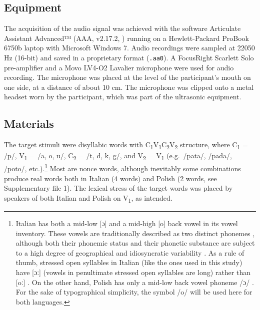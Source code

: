 \documentclass[charis]{glossa}
\begin{document}
\hypertarget{equipment}{%
\subsection{Equipment}\label{equipment}}

The acquisition of the audio signal was achieved with the software
Articulate Assistant Advanced™ (AAA, v2.17.2, \citealt{articulate2011})
running on a Hewlett-Packard ProBook 6750b laptop with Microsoft Windows
7. Audio recordings were sampled at 22050 Hz (16-bit) and saved in a
proprietary format (\texttt{.aa0}). A FocusRight Scarlett Solo
pre-amplifier and a Movo LV4-O2 Lavalier microphone were used for audio
recording. The microphone was placed at the level of the participant's
mouth on one side, at a distance of about 10 cm. The microphone was
clipped onto a metal headset worn by the participant, which was part of
the ultrasonic equipment.

\hypertarget{materials}{%
\subsection{Materials}\label{materials}}

\label{s:materials}

The target stimuli were disyllabic words with
C\textsubscript{1}V\textsubscript{1}C\textsubscript{2}V\textsubscript{2}
structure, where C\textsubscript{1} = /p/, V\textsubscript{1} = /a, o,
u/, C\textsubscript{2} = /t, d, k, g/, and V\textsubscript{2} =
V\textsubscript{1} (e.g.~/pata/, /pada/, /poto/,
etc.).\footnote{Italian has both a mid-low [ɔ] and a mid-high [o] back vowel in its vowel inventory. These vowels are traditionally described as two distinct phonemes \citep{kramer2009}, although both their phonemic status and their phonetic substance are subject to a high degree of geographical and idiosyncratic variability \citep{renwick2016}. As a rule of thumb, stressed open syllables in Italian (like the ones used in this study) have [ɔː] (vowels in penultimate stressed open syllables are long) rather than [oː] \citep{renwick2016}. On the other hand, Polish has only a mid-low back vowel phoneme /ɔ/ \citep{gussmann2007}. For the sake of typographical simplicity, the symbol /o/ will be used here for both languages.}
Most are nonce words, although inevitably some combinations produce real
words both in Italian (4 words) and Polish (2 words, see Supplementary
file 1). The lexical stress of the target words was placed by speakers
of both Italian and Polish on V\textsubscript{1}, as intended.
\end{document}
